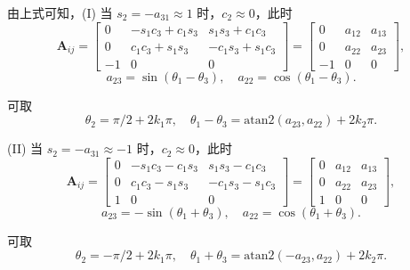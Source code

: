 由上式可知，(I) 当 $s_2 = -a_{31} \approx 1$ 时，$c_2 \approx 0$，此时
\begin{equation}
    \bm{A}_{ij} = \begin{bmatrix}
        0 & -s_1c_3 + c_1s_3 & s_1s_3 + c_1c_3\\
        0 & c_1c_3 + s_1s_3 & -c_1s_3 + s_1c_3\\
        -1 & 0 & 0
    \end{bmatrix}
    = \begin{bmatrix}
        0 & a_{12} & a_{13}\\
        0 & a_{22} & a_{23}\\
        -1 & 0 & 0
    \end{bmatrix},
\end{equation}
\begin{equation}
    a_{23} = \sin(\theta_1 - \theta_3),\quad a_{22} = \cos(\theta_1 - \theta_3).
\end{equation}

可取
\begin{equation}
    \theta_2 = \pi/2 + 2k_1\pi,\quad \theta_1 - \theta_3 = \mathrm{atan2}(a_{23}, a_{22}) + 2k_2\pi.
\end{equation}

(II) 当 $s_2 = -a_{31} \approx -1$ 时，$c_2 \approx 0$，此时
\begin{equation}
    \bm{A}_{ij} = \begin{bmatrix}
        0 & -s_1c_3 - c_1s_3 & s_1s_3 - c_1c_3\\
        0 & c_1c_3 - s_1s_3 & -c_1s_3 - s_1c_3\\
        1 & 0 & 0
    \end{bmatrix}
    = \begin{bmatrix}
        0 & a_{12} & a_{13}\\
        0 & a_{22} & a_{23}\\
        1 & 0 & 0
    \end{bmatrix},
\end{equation}
\begin{equation}
    a_{23} = -\sin(\theta_1 + \theta_3),\quad a_{22} = \cos(\theta_1 + \theta_3).
\end{equation}

可取
\begin{equation}
    \theta_2 = -\pi/2 + 2k_1\pi,\quad \theta_1 + \theta_3 = \mathrm{atan2}(-a_{23}, a_{22}) + 2k_2\pi.
\end{equation}

